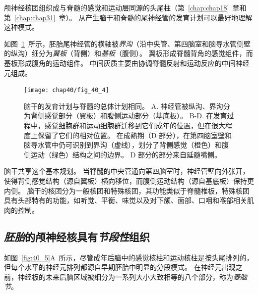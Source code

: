 颅神经核团组织成与脊髓的感觉和运动层同源的头尾柱（第~\ref{chap:chap18}~章和第~\ref{chap:chap31}~章）。
从产生脑干和脊髓的尾神经管的发育计划可以最好地理解这种模式。


如图~\ref{fig:40_4}~所示，胚胎尾神经管的横轴被\textit{界沟}（沿中央管、第四脑室和脑导水管侧壁的纵沟）细分为\textit{翼板}（背侧）和\textit{基板}（腹侧）。
翼板形成脊髓背角的感觉组件，而基板形成腹角的运动组件。
中间灰质主要由协调脊髓反射和运动反应的中间神经元组成。


\begin{figure}[htbp]
	\centering
	\texttt{[image: chap40/fig\_40\_4]}
	\caption{脑干的发育计划与脊髓的总体计划相同。
		A. 神经管被纵沟、界沟分为背侧感觉部分（翼板）和腹侧运动部分（基底板）。
		B-D. 在发育过程中，感觉细胞群和运动细胞群迁移到它们成年的位置，但在很大程度上保留了它们的相对位置。
		在成熟期（D 部分），在第四脑室壁和脑导水管中仍可识别到界沟（虚线），划分了背侧感觉（橙色）和腹侧运动（绿色）结构之间的边界。
		D 部分的部分来自延髓嘴侧。}
	\label{fig:40_4}
\end{figure}


脑干共享这个基本规划。
当脊髓的中央管通向第四脑室时，神经管壁向外张开，使得背侧感觉结构（源自翼板）横向移位，而腹侧运动结构（源自基底板）保持更内侧。
脑干的核团分为一般核团和特殊核团，其功能类似于脊髓椎板，特殊核团具有头部特有的功能，如听觉、平衡、味觉以及对下颌、面部、口咽和喉部相关肌肉的控制。



\subsection{\textit{胚胎}的颅神经核具有\textit{节段性}组织}

如图~\ref{fig:40_5}A~所示，尽管成年后脑中的感觉核柱和运动核柱是按头尾排列的，但每个水平的神经元排列都源自早期胚胎中明显的分段模式。
在神经元出现之前，神经板的未来后脑区域被细分为一系列大小大致相等的八个部分，称为\textit{菱脑节}。


